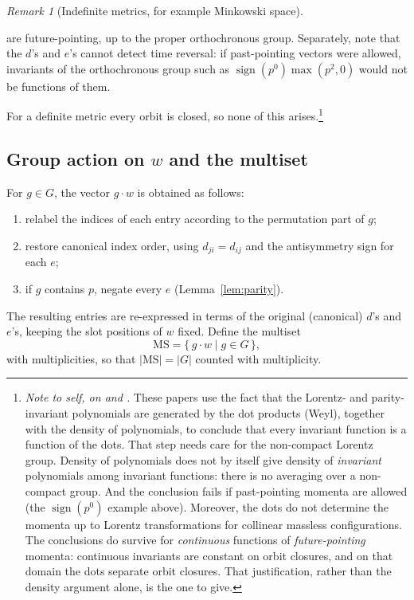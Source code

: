\documentclass[11pt]{article}
\theoremstyle{definition}
\theoremstyle{remark}
\newtheorem{remark}{Remark}
\newcommand{\MS}{\mathrm{MS}}
\begin{document}
\begin{remark}[Indefinite metrics, for example Minkowski space]
\begin{itemize}
    are future-pointing, up to the proper orthochronous group. Separately,
    note that the $d$'s and $e$'s cannot detect time reversal: if past-pointing
    vectors were allowed, invariants of the orthochronous group such as
    $\operatorname{sign}(p^0) \max(p^2, 0)$ would not be functions of them.
\end{itemize}
For a definite metric every orbit is closed, so none of this arises.\footnote{%
  \emph{Note to self, on \cite{GHL20} and \cite{LHG22}.} These papers use the
  fact that the Lorentz- and parity-invariant polynomials are generated by the
  dot products (Weyl), together with the density of polynomials, to conclude
  that every invariant function is a function of the dots. That step needs care
  for the non-compact Lorentz group. Density of polynomials does not by itself
  give density of \emph{invariant} polynomials among invariant functions: there
  is no averaging over a non-compact group. And the conclusion fails if
  past-pointing momenta are allowed (the $\operatorname{sign}(p^0)$ example
  above). Moreover, the dots do not determine the momenta up to Lorentz
  transformations for collinear massless configurations. The conclusions do
  survive for \emph{continuous} functions of \emph{future-pointing} momenta:
  continuous invariants are constant on orbit closures, and on that domain the
  dots separate orbit closures. That justification, rather than the
  density argument alone, is the one to give.}
\end{remark}

\subsection{Group action on $w$ and the multiset}

For $g \in G$, the vector $g \cdot w$ is obtained as follows:
\begin{enumerate}
  \item relabel the indices of each entry according to the permutation part
    of $g$;
  \item restore canonical index order, using $d_{ji} = d_{ij}$ and the
    antisymmetry sign for each $e$;
  \item if $g$ contains $p$, negate every $e$ (Lemma~\ref{lem:parity}).
\end{enumerate}
The resulting entries are re-expressed in terms of the original (canonical)
$d$'s and $e$'s, keeping the slot positions of $w$ fixed. Define the multiset
\[
  \MS = \{\, g \cdot w \mid g \in G \,\},
\]
with multiplicities, so that $|\MS| = |G|$ counted with multiplicity.
\end{document}
